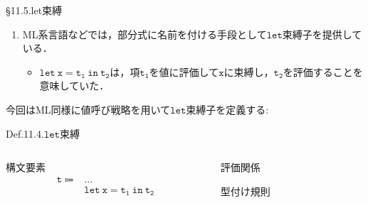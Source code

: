 \documentclass[9pt]{beamer}
\begin{document}
\begin{frame}{\S11.5.let束縛}
\begin{enumerate}
\item ML系言語などでは，部分式に名前を付ける手段として$\mathtt{let}$束縛子を提供している．\begin{itemize}
\item $\mathtt{let\ x = t_{1}\ in\ t_{2}}$は，項$\mathtt{t_{1}}$を値に評価して$\mathtt{x}$に束縛し，$\mathtt{t_{2}}$を評価することを意味していた．
\end{itemize}\end{enumerate}
今回はML同様に値呼び戦略を用いて$\mathtt{let}$束縛子を定義する:
\begin{alertblock}{Def.11.4.$\mathtt{let}$束縛}
    \begin{columns}
    \begin{column}{0.3\columnwidth}
        構文要素
        \begin{align*}
        \mathtt{t}\Coloneq&\ldots\\
            &\mathtt{let\ x = t_{1}\ in\ t_{2}}
        \end{align*}
    \end{column}
    \begin{column}{0.65\columnwidth}
        評価関係
        \begin{prooftree}
            \end{prooftree}
            \begin{prooftree}
                \end{prooftree}
        型付け規則
        \begin{prooftree}
        \end{prooftree}
    \end{column}
    \end{columns}
\end{alertblock}
\end{frame}
\end{document}
